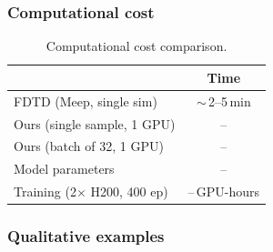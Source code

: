 \subsubsection{Computational cost}


\begin{table}[t]
\centering
\caption{Computational cost comparison.}
\label{tab:cost}
\begin{tabular}{lc}
\hline\hline
 & Time \\
\hline
FDTD (Meep, single sim)           & $\sim$\,2--5\,min \\
Ours (single sample, 1 GPU)       & -- \\
Ours (batch of 32, 1 GPU)         & -- \\
\hline
Model parameters                   & -- \\
Training (2$\times$ H200, 400 ep) & --\,GPU-hours \\
\hline\hline
\end{tabular}
\end{table}

\subsubsection{Qualitative examples}



